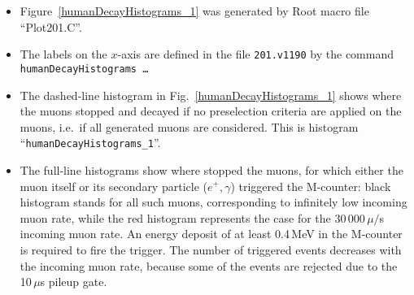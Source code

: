 \documentclass[twoside]{dis04}
\begin{document}
\begin{itemize}
  \item Figure~\ref{humanDecayHistograms_1} was generated by Root macro file ``Plot201.C''.
  \item The labels on the $x$-axis are defined in the file {\tt 201.v1190} by the
	command \\ 
	{\tt humanDecayHistograms \ldots}
  \item The dashed-line histogram in  Fig.~\ref{humanDecayHistograms_1} 
        shows where the muons stopped and decayed if no preselection
	criteria are applied on the muons, i.e.\ if all generated muons are considered.
        This is histogram ``{\tt humanDecayHistograms\_1}''.
  \item The full-line histograms show
        where stopped the muons, for which either the muon itself or its secondary
	particle ($e^+, \gamma$) triggered the M-counter:  black histogram stands for
	all such muons, corresponding to infinitely low incoming muon rate, while
	the red histogram represents the case for the 30\,000\,$\mu/$s incoming muon rate.
	An energy deposit of at least 0.4\,MeV in the M-counter is required to fire the trigger.
	The number of triggered events decreases with the incoming muon rate,
	because some of the events are rejected due to the 10\,$\mu$s pileup gate.


\end{itemize}
\end{document}
